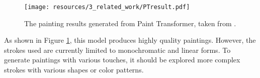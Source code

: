 \vspace{0.7cm}

\begin{figure}[h]
    \centering
    \texttt{[image: resources/3\_related\_work/PTresult.pdf]}
    \caption{
        The painting results generated from Paint Transformer,
        taken from \cite{liu2021paint}.
    }
    \label{PTresult}
\end{figure}
As shown in Figure \ref{PTresult}, this model produces highly quality paintings.
However, the strokes used are currently limited to monochromatic and linear forms.
To generate paintings with various touches, it should be explored more complex 
strokes with various shapes or color patterns.

